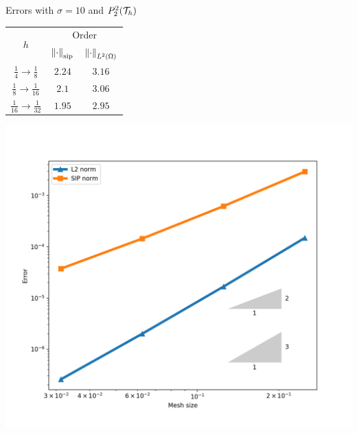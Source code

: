		
		\begin{frame}{Errors with $\sigma=10$ and $\relax{P}^2_2(\mathcal{T}_h)$}
		\begin{minipage}{0.49\textwidth}
			\centering
			\begin{tabular}{|c|c|c|}
				\hline 
				\multirow{2}{*}{$h$} & \multicolumn{2}{c|}{Order} \\
				\cline{2-3}
				&  $\left\|\cdot\right\|_{\text{sip}}$ & $\left\|\cdot\right\|_{L^2(\Omega)}$ \\ 
				\hline
				\hline
				$\frac{1}{4}\to\frac{1}{8}$ & $2.24$ & $3.16$ \\ 
				\hline 
				$\frac{1}{8}\to\frac{1}{16}$ & $2.1$ & $3.06$ \\ 
				\hline 
				$\frac{1}{16}\to\frac{1}{32}$ & $1.95$ & $2.95$\\
				\hline
			\end{tabular}
		\end{minipage}
		\begin{minipage}{0.5\textwidth}
			\centering
			\includegraphics[scale=0.30]{img/Difusion/errores_difusion_P2dc.png}
		\end{minipage}
		\end{frame}
		
